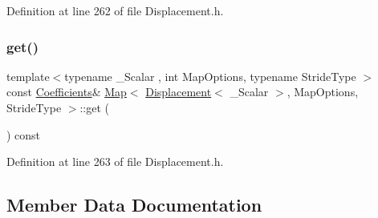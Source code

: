 Definition at line 262 of file Displacement.\+h.

\hypertarget{class_map_3_01_displacement_3_01___scalar_01_4_00_01_map_options_00_01_stride_type_01_4_a001e7c523f8895fce55047968d4ae80f}{}\label{class_map_3_01_displacement_3_01___scalar_01_4_00_01_map_options_00_01_stride_type_01_4_a001e7c523f8895fce55047968d4ae80f} 
\subsubsection{\texorpdfstring{get()}{get()}\hspace{0.1cm}{\footnotesize\ttfamily [2/2]}}
{\footnotesize\ttfamily template$<$typename \+\_\+\+Scalar , int Map\+Options, typename Stride\+Type $>$ \\
const \hyperlink{class_map_3_01_displacement_3_01___scalar_01_4_00_01_map_options_00_01_stride_type_01_4_a3213feadb99e77889a832a1ef1e80b4b}{Coefficients}\& \hyperlink{class_map_3_01_displacement_3_01___scalar_01_4_00_01_map_options_00_01_stride_type_01_4_a7355e77dc9b91bd8cb68f20847318f0f}{Map}$<$ \hyperlink{class_displacement}{Displacement}$<$ \+\_\+\+Scalar $>$, Map\+Options, Stride\+Type $>$\+::get (\begin{DoxyParamCaption}{ }\end{DoxyParamCaption}) const\hspace{0.3cm}{\ttfamily [inline]}}



Definition at line 263 of file Displacement.\+h.



\subsection{Member Data Documentation}
\hypertarget{class_map_3_01_displacement_3_01___scalar_01_4_00_01_map_options_00_01_stride_type_01_4_a07b764e529a32d3b74ffc19d4a0949ab}{}\label{class_map_3_01_displacement_3_01___scalar_01_4_00_01_map_options_00_01_stride_type_01_4_a07b764e529a32d3b74ffc19d4a0949ab} 
